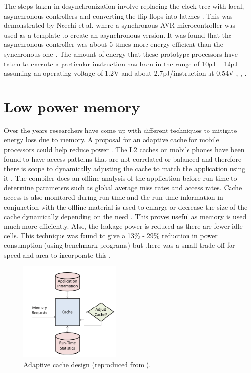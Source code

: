 \documentclass[journal]{IEEEtran}
\begin{document}
The steps taken in desynchronization involve replacing the clock tree with local, asynchronous controllers and converting the flip-flops into latches \cite{AVR}. This was demonstrated by Neechi et al. \cite{AVR} where a synchronous AVR microcontroller was used as a template to create an asynchronous version. It was found that the asynchronous controller was about 5 times more energy efficient than the synchronous one \cite{AVR}. The amount of energy that these prototype processors have taken to execute a particular instruction has been in the range of 10pJ – 14pJ assuming an operating voltage of 1.2V and about 2.7pJ/instruction at 0.54V \cite{SNAP/LE}, \cite{AVR}, \cite{SmartDust}.
	 
\section{Low power memory}
Over the years researchers have come up with different techniques to mitigate energy loss due to memory. A proposal for an adaptive cache for mobile processors could help reduce power \cite{Mem-Cache}. The L2 caches on mobile phones have been found to have access patterns that are not correlated or balanced and therefore there is scope to dynamically adjusting the cache to match the application using it \cite{Mem-Cache}. The compiler does an offline analysis of the application before run-time to determine parameters such as global average miss rates and access rates. Cache access is also monitored during run-time and the run-time information in conjunction with the offline material is used to enlarge or decrease the size of the cache dynamically depending on the need \cite{Mem-Cache}. This proves useful as memory is used much more efficiently. Also, the leakage power is reduced as there are fewer idle cells. This technique was found to give a 13\% - 29\% reduction in power consumption (using benchmark programs) but there was a small trade-off for speed and area to incorporate this \cite{Mem-Cache}.\\

	\begin{figure}[h]
	   \centering
	   \includegraphics[width = 5cm]{AdaptiveCache}
	   \caption{Adaptive cache design (reproduced from \cite{Mem-Cache}).}
	   \label{Figure:Mem-Cache}
	\end{figure}	
	\FloatBarrier
\end{document}

